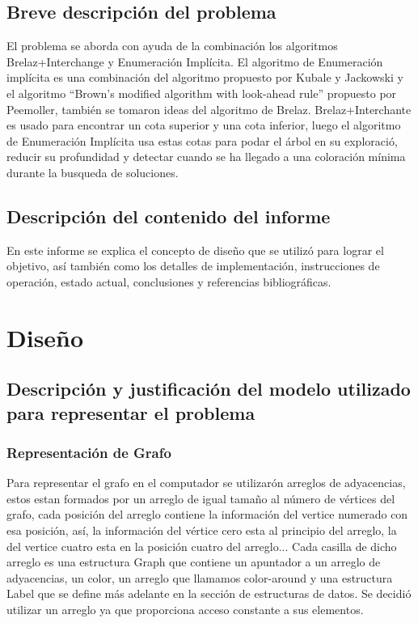 \documentclass[a4paper,10pt]{article}
\begin{document}
\subsection{Breve descripción del problema}
El problema se aborda con ayuda de la combinación los algoritmos 
Brelaz+Interchange y Enumeraci\'on Impl\'icita. El algoritmo de
Enumeraci\'on impl\'icita es una combinaci\'on del algoritmo propuesto por Kubale y
Jackowski y el algoritmo ``Brown's modified algorithm with look-ahead
rule'' propuesto por Peemoller, tambi\'en se tomaron ideas del algoritmo
de Brelaz.
Brelaz+Interchante es usado para encontrar un cota superior y una
cota inferior, luego el algoritmo de Enumeración Implícita usa estas
cotas para podar el \'arbol en su exploració, reducir su profundidad
y detectar cuando se ha llegado a una coloración mínima durante la
busqueda de soluciones.

\subsection{Descripción del contenido del informe}
En este informe se explica el concepto de diseño que se utilizó
para lograr el objetivo, así también como los detalles de implementación, 
instrucciones de operación, estado actual, conclusiones y referencias bibliográficas.

\section{Diseño}

\subsection{Descripción y justificación del modelo utilizado para
  representar el problema}

\subsubsection{Representación de Grafo }
Para representar el grafo en el computador se utilizar\'on arreglos de
  adyacencias, estos estan formados por un arreglo de igual tamaño al número de
  vértices del grafo, cada posici\'on del arreglo contiene la
  informaci\'on del vertice numerado con esa posici\'on, as\'i, la
  informaci\'on del v\'ertice cero esta al principio del arreglo, la del
  vertice cuatro esta en la posici\'on cuatro del arreglo... Cada
  casilla de dicho arreglo es una estructura Graph que contiene un
  apuntador a un arreglo de adyacencias, un color, un arreglo que
  llamamos color-around y una estructura Label que se define m\'as
  adelante en la secci\'on de estructuras de datos. Se decidió utilizar
  un arreglo ya que proporciona acceso constante a sus elementos.\\
\end{document}
